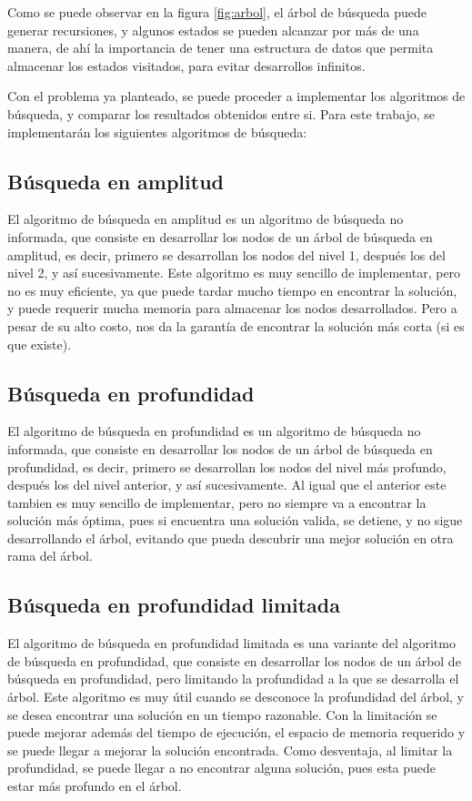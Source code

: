 \documentclass[journal]{IEEEtran}
\begin{document}
Como se puede observar en la figura \ref{fig:arbol}, el árbol de búsqueda puede generar recursiones, y algunos estados se pueden alcanzar por más de una manera, de ahí la importancia de tener una estructura de datos que permita almacenar los estados visitados, para evitar desarrollos infinitos.

Con el problema ya planteado, se puede proceder a implementar los algoritmos de búsqueda, y comparar los resultados obtenidos entre si. Para este trabajo, se implementarán los siguientes algoritmos de búsqueda:

\subsection{Búsqueda en amplitud}
El algoritmo de búsqueda en amplitud es un algoritmo de búsqueda no informada, que consiste en desarrollar los nodos de un árbol de búsqueda en amplitud, es decir, primero se desarrollan los nodos del nivel 1, después los del nivel 2, y así sucesivamente. Este algoritmo es muy sencillo de implementar, pero no es muy eficiente, ya que puede tardar mucho tiempo en encontrar la solución, y puede requerir mucha memoria para almacenar los nodos desarrollados.
Pero a pesar de su alto costo, nos da la garantía de encontrar la solución más corta (si es que existe).

\subsection{Búsqueda en profundidad}
El algoritmo de búsqueda en profundidad es un algoritmo de búsqueda no informada, que consiste en desarrollar los nodos de un árbol de búsqueda en profundidad, es decir, primero se desarrollan los nodos del nivel más profundo, después los del nivel anterior, y así sucesivamente. Al igual que el anterior este tambien es muy sencillo de implementar, pero no siempre va a encontrar la solución más óptima, pues si encuentra una solución valida, se detiene, y no sigue desarrollando el árbol, evitando que pueda descubrir una mejor solución en otra rama del árbol.

\subsection{Búsqueda en profundidad limitada}
El algoritmo de búsqueda en profundidad limitada es una variante del algoritmo de búsqueda en profundidad, que consiste en desarrollar los nodos de un árbol de búsqueda en profundidad, pero limitando la profundidad a la que se desarrolla el árbol. Este algoritmo es muy útil cuando se desconoce la profundidad del árbol, y se desea encontrar una solución en un tiempo razonable. Con la limitación se puede mejorar además del tiempo de ejecución, el espacio de memoria requerido y se puede llegar a mejorar la solución encontrada. Como desventaja, al limitar la profundidad, se puede llegar a no encontrar alguna solución, pues esta puede estar más profundo en el árbol.
\end{document}
